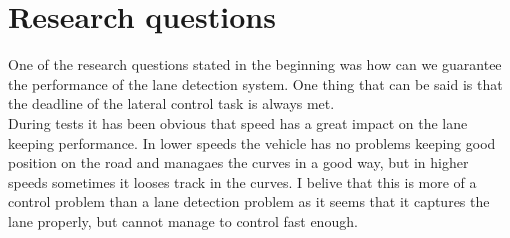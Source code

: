 \section{Research questions}

One of the research questions stated in the beginning was how can we guarantee the performance of the lane detection system. One thing that can be said is that the deadline of the lateral control task is always  met.\\

During tests it has been obvious that speed has a great impact on the lane keeping performance. In lower speeds the vehicle has no problems keeping good position on the road and managaes the curves in a good way, but in higher speeds sometimes it looses track in the curves. I belive that this is more of a control problem than a lane detection problem as it seems that it captures the lane properly, but cannot manage to control fast enough.